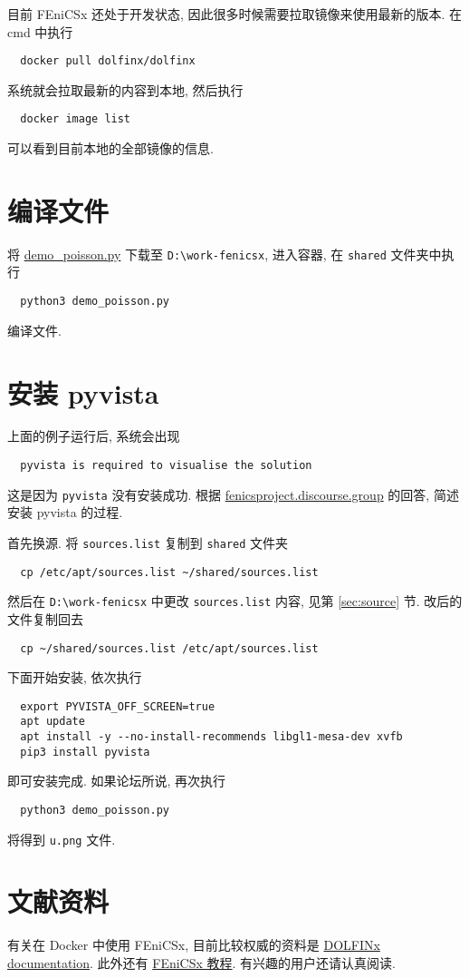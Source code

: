 \documentclass[fontset=founder]{ctexrep}
\begin{document}
目前 FEniCSx 还处于开发状态,
因此很多时候需要拉取镜像来使用最新的版本.
在 \textsf{cmd} 中执行
\begin{lstlisting}
  docker pull dolfinx/dolfinx
\end{lstlisting}
系统就会拉取最新的内容到本地,
然后执行
\begin{lstlisting}
  docker image list
\end{lstlisting}
可以看到目前本地的全部镜像的信息.

\section{编译文件}

将 \href{https://docs.fenicsproject.org/dolfinx/main/python/_downloads/756b4617c0f8921ed14fbd158af0c99c/demo_poisson.py}{demo\_poisson.py} 下载至 \texttt{D:\textbackslash work-fenicsx},
进入容器,
在 \texttt{shared} 文件夹中执行
\begin{lstlisting}
  python3 demo_poisson.py
\end{lstlisting}
编译文件.

\section{安装 pyvista}

上面的例子运行后,
系统会出现
\begin{lstlisting}
  pyvista is required to visualise the solution
\end{lstlisting}
这是因为 \texttt{pyvista} 没有安装成功.
根据 \href{https://fenicsproject.discourse.group/t/how-to-use-pyvista-in-docker-for-windows-10-user/6921}{fenicsproject.discourse.group} 的回答,
简述安装 pyvista 的过程.

首先换源.
将 \texttt{sources.list} 复制到 \texttt{shared} 文件夹
\begin{lstlisting}
  cp /etc/apt/sources.list ~/shared/sources.list
\end{lstlisting}
然后在 \texttt{D:\textbackslash work-fenicsx} 中更改 \texttt{sources.list} 内容,
见第 \ref{sec:source} 节.
改后的文件复制回去
\begin{lstlisting}
  cp ~/shared/sources.list /etc/apt/sources.list
\end{lstlisting}

下面开始安装,
依次执行
\begin{lstlisting}
  export PYVISTA_OFF_SCREEN=true
  apt update
  apt install -y --no-install-recommends libgl1-mesa-dev xvfb
  pip3 install pyvista
\end{lstlisting}
即可安装完成.
如果论坛所说,
再次执行
\begin{lstlisting}
  python3 demo_poisson.py
\end{lstlisting}
将得到 \texttt{u.png} 文件.

\section{文献资料}

有关在 Docker 中使用 FEniCSx,
目前比较权威的资料是 \href{https://docs.fenicsproject.org/dolfinx/main/python/index.html}{DOLFINx documentation}.
此外还有  \href{https://jorgensd.github.io/dolfinx-tutorial/index.html}{FEniCSx 教程}.
有兴趣的用户还请认真阅读.
\end{document}
